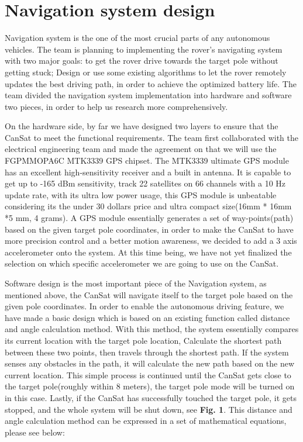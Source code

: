 \documentclass[10pt,letterpaper,onecolumn,journal]{IEEEtran}
\begin{document}
\par
\section{Navigation system design}
Navigation system is the one of the most crucial parts of any autonomous vehicles. The team is planning to implementing the rover's navigating system with two major goals: to get the rover drive towards the target pole without getting stuck; Design or use some existing algorithms to let the rover remotely updates the best driving path, in order to achieve the optimized battery life. The team divided the navigation system implementation into hardware and software two pieces, in order to help us research more comprehensively.\vspace{.3cm}
\par
On the hardware side, by far we have designed two layers to ensure that the CanSat to meet the functional requirements. The team first collaborated with the electrical engineering team and made the agreement on that we will use the FGPMMOPA6C MTK3339 GPS chipset. The MTK3339 ultimate GPS module has an excellent high-sensitivity receiver and a built in antenna. It is capable to get up to -165 dBm sensitivity, track 22 satellites on 66 channels with a 10 Hz update rate, with its ultra low power usage, this GPS module is unbeatable considering its the under 30 dollars price and ultra compact size(16mm * 16mm *5 mm, 4 grams). A GPS module essentially generates a set of way-points(path) based on the given target pole coordinates, in order to make the CanSat to have more precision control and a better motion awareness, we decided to add a 3 axis accelerometer onto the system. At this time being, we have not yet finalized the selection on which specific accelerometer we are going to use on the CanSat. \vspace{.3cm}
\par 
Software design is the most important piece of the Navigation system, as mentioned above, the CanSat will navigate itself to the target pole based on the given pole coordinates. In order to enable the autonomous driving feature, we have made a basic design which is based on an existing function called distance and angle calculation method.\cite{Dhanasingaraja} With this method, the system essentially compares its current location with the target pole location, Calculate the shortest path between these two points, then travels through the shortest path. If the system senses any obstacles in the path, it will calculate the new path based on the new current location. This simple process is continued until the CanSat gets close to the target pole(roughly within 8 meters), the target pole mode will be turned on in this case. Lastly, if the CanSat has successfully touched the target pole, it gets stopped, and the whole system will be shut down, see \textbf{Fig. 1}. This distance and angle calculation method can be expressed in a set of mathematical equations, please see below:  \vspace{.3cm}
\end{document}
